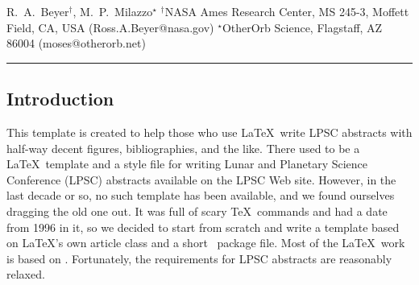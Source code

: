 \documentclass[twoside]{article}
\begin{document}

{R.~A.~Beyer$^{\dag}$, M.~P.~Milazzo$^{\star}$ $^{\dag}$NASA Ames Research Center, MS 245-3, Moffett Field, CA, USA (Ross.A.Beyer@nasa.gov) $^{\star}$OtherOrb Science, Flagstaff, AZ 86004 (moses@otherorb.net) \\ \hrule
} 

%

%


\balance


\subsection*{Introduction} This template is created to help those who use
\LaTeX\ write LPSC abstracts with half-way decent figures, bibliographies, 
and the like. 
There used to be a \LaTeX\ template and a style file for writing
Lunar and Planetary Science Conference (LPSC) abstracts available
on the LPSC Web site.  
However, in the last decade or so, no such template has been available, and we found ourselves dragging the old one out.  
It was full of scary \TeX\ commands and had a date from 1996 in it, so we decided to start from scratch and write a template based on \LaTeX's own article class and a short \LaTeXe\ package file.  
Most of the \LaTeX\ work is based on \citep{kopka2003guide}.
Fortunately, the requirements for LPSC abstracts \citep{LPSC} are reasonably relaxed.
\end{document}
